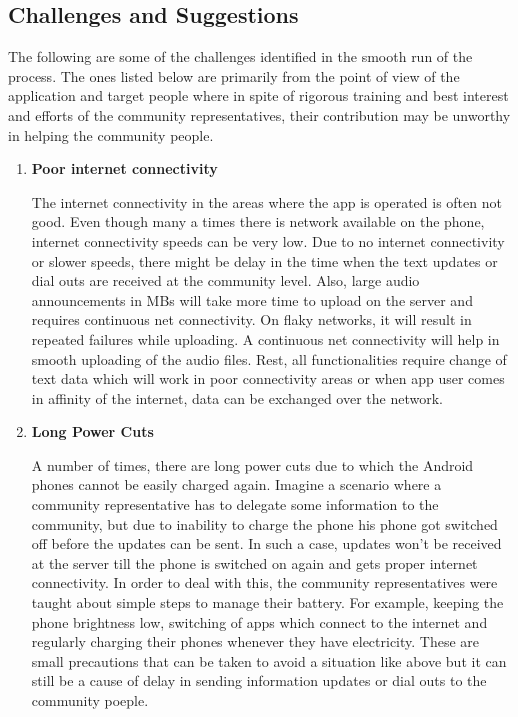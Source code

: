 \begin{itemize}
\section{Challenges and Suggestions}

The following are some of the challenges identified in the smooth run of the process. The ones listed below are primarily from the point of view of the application and target people where in spite of rigorous training and best interest and efforts of the community representatives, their contribution may be unworthy in helping the community people.

\begin {enumerate}

\item \textbf{ Poor internet connectivity}

The internet connectivity in the areas where the app is operated is often not good. Even though many a times there is network available on the phone, internet connectivity speeds can be very low. Due to no internet connectivity or slower speeds, there might be delay in the time when the text updates or dial outs are received at the community level. Also, large audio announcements in MBs will take more time to upload on the server and requires continuous net connectivity. On flaky networks, it will result in repeated failures while uploading. A continuous net connectivity will help in smooth uploading of the audio files. Rest, all functionalities require change of text data which will work in poor connectivity areas or when app user comes in affinity of the internet, data can be exchanged over the network.

\item \textbf{ Long Power Cuts}

A number of times, there are long power cuts due to which the Android phones cannot be easily charged again. Imagine a scenario where a community representative has to delegate some information to the community, but due to inability to charge the phone his phone got switched off before the updates can be sent. In such a case, updates won’t be received at the server till the phone is switched on again and gets proper internet connectivity. In order to deal with this, the community representatives were taught about simple steps to manage their battery. For example, keeping the phone brightness low, switching of apps which connect to the internet and regularly charging their phones whenever they have electricity. These are small precautions that can be taken to avoid a situation like above but it can still be a
cause of delay in sending information updates or dial outs to the community poeple.


\end{enumerate}
\end{itemize}
